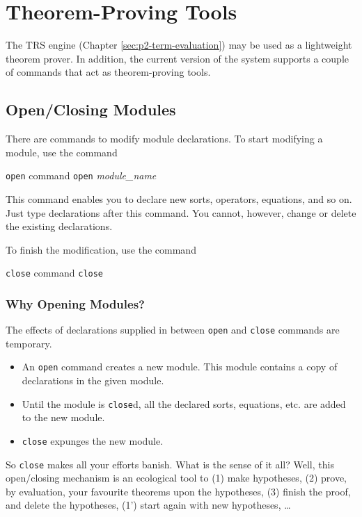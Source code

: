 \documentclass[a4paper]{memoir}
\begin{document}
\chapter{Theorem-Proving Tools}\label{sec:p2-theorem-proving}

The TRS engine (Chapter \ref{sec:p2-term-evaluation}) may be used as a
lightweight theorem prover. In addition, the current version of the
system supports a couple of commands that act as theorem-proving
tools.

\section{Open/Closing Modules}\label{sec:p2-open-close}

There are commands to modify module declarations. To start modifying a
module, use the command

\begin{bsyntax} \texttt{open} command  \Hline
\texttt{open} \textit{module\_name}
\end{bsyntax}

This command enables you to declare new sorts, operators, equations,
and so on. Just type declarations after this command.
You cannot, however, change or delete the existing declarations.

To finish the modification, use the command

\begin{bsyntax} \texttt{close} command  \Hline
\texttt{close}
\end{bsyntax}

\subsection{Why Opening Modules?}\label{sec:p2-usage-of-open}

The effects of declarations supplied in between \verb|open| and
\verb|close| commands are temporary.
\begin{itemize}
\item An \verb|open| command creates a new module. This module contains
  a copy of declarations in the given module.
\item Until the module is \verb|close|d, all the declared sorts,
  equations, etc. are added to the new module.
\item \verb|close| expunges the new module.
\end{itemize}
So \verb|close| makes all your efforts banish. What is the sense of it all?
Well, this open/closing mechanism is an ecological tool to (1) make
hypotheses,
(2) prove, by evaluation, your favourite theorems upon the hypotheses,
(3) finish the proof, and delete the hypotheses, (1') start again with
new hypotheses, \ldots
\end{document}
